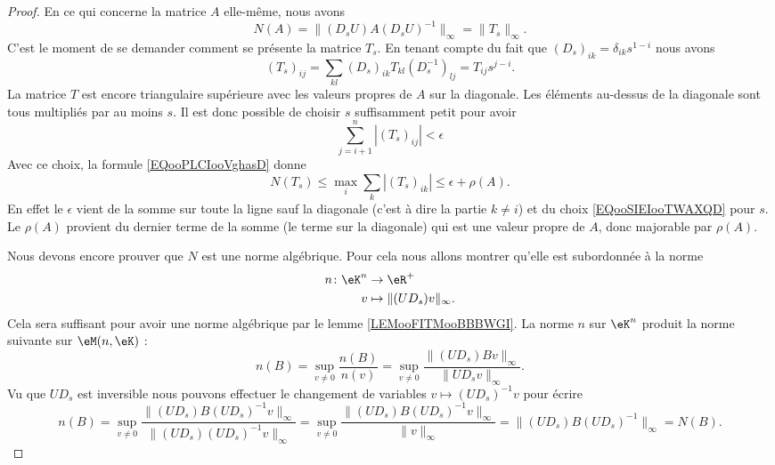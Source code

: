\begin{proof}
    En ce qui concerne la matrice \( A\) elle-même, nous avons
    \begin{equation}
        N(A)=\| (D_sU)A(D_sU)^{-1} \|_{\infty}=\| T_s \|_{\infty}.
    \end{equation}
    C'est le moment de se demander comment se présente la matrice \( T_s\). En tenant compte du fait que \( (D_s)_{ik}=\delta_{ik}s^{1-i}\) nous avons
    \begin{equation}
        (T_s)_{ij}=\sum_{kl}(D_s)_{ik}T_{kl}(D^{-1}_s)_{lj}=T_{ij}s^{j-i}.
    \end{equation}
    La matrice \( T\) est encore triangulaire supérieure avec les valeurs propres de \( A\) sur la diagonale. Les éléments au-dessus de la diagonale sont tous multipliés par au moins \( s\). Il est donc possible de choisir \( s\) suffisamment petit pour avoir
    \begin{equation}        \label{EQooSIEIooTWAXQD}
        \sum_{j=i+1}^n| (T_s)_{ij} |<\epsilon
    \end{equation}
    Avec ce choix, la formule \ref{EQooPLCIooVghasD} donne
    \begin{equation}
        N(T_s)\leq\max_i\sum_k| (T_s)_{ik} |\leq \epsilon+\rho(A).
    \end{equation}
    En effet le \( \epsilon\) vient de la somme sur toute la ligne sauf la diagonale (c'est à dire la partie \( k\neq i\)) et du choix \eqref{EQooSIEIooTWAXQD} pour \( s\). Le \( \rho(A)\) provient du dernier terme de la somme (le terme sur la diagonale) qui est une valeur propre de \( A\), donc majorable par \( \rho(A)\).

    Nous devons encore prouver que \( N\) est une norme algébrique. Pour cela nous allons montrer qu'elle est subordonnée à la norme
    \begin{equation}
        \begin{aligned}
            n\colon \eK^n&\to \eR^+ \\
            v&\mapsto \| (UD_s)v \|_{\infty}.
        \end{aligned}
    \end{equation}
    Cela sera suffisant pour avoir une norme algébrique par le lemme \ref{LEMooFITMooBBBWGI}. La norme \( n\) sur \( \eK^n\) produit la norme suivante sur \( \eM(n,\eK)\) :
    \begin{equation}
        n(B)=\sup_{v\neq 0}\frac{ n(B) }{ n(v) }=\sup_{v\neq 0}\frac{ \| (UD_s)Bv \|_{\infty} }{ \| UD_sv \|_{\infty} }.
    \end{equation}
    Vu que \( UD_s\) est inversible nous pouvons effectuer le changement de variables \( v\mapsto (UD_s)^{-1} v\) pour écrire
    \begin{equation}
        n(B)=\sup_{v\neq 0}  \frac{  \| (UD_s)B(UD_s)^{-1}v \|_{\infty} }{ \| (UD_s)(UD_s)^{-1}v \|_{\infty} }=\sup_{v\neq 0}\frac{  \| (UD_s)B(UD_s)^{-1}v \|_{\infty} }{ \| v \|_{\infty} }=\| (UD_s)B(UD_s)^{-1} \|_{\infty}=N(B).  
    \end{equation}
\end{proof}

